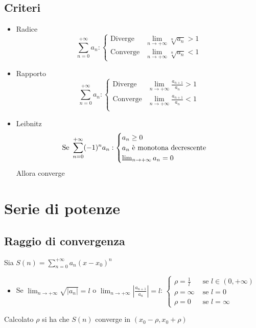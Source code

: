 \documentclass[11pt]{article}
\theoremstyle{definition}
\theoremstyle{remark}
\begin{document}
\subsection*{Criteri}
\begin{itemize}
    \item Radice
        \begin{equation*}
            \sum_{n=0}^{+\infty}a_n: \begin{cases}
                \text{Diverge} & \lim_{n\to+\infty}\sqrt[n]{a_n} > 1\\
                \text{Converge} & \lim_{n\to+\infty}\sqrt[n]{a_n} < 1
            \end{cases}
        \end{equation*}
    \item Rapporto
        \begin{equation*}
            \sum_{n=0}^{+\infty}a_n: \begin{cases}
                \text{Diverge} & \lim_{n\to+\infty} \frac{a_{n+1}}{a_n} > 1\\
                \text{Converge} & \lim_{n\to+\infty} \frac{a_{n+1}}{a_n} < 1\\            \end{cases}
        \end{equation*}
    \item Leibnitz
        \begin{equation*}
            \text{Se }\sum_{n=0}^{+\infty}(-1)^na_n: \begin{cases}
                a_n\geq 0 \\
                a_n \text{ è monotona decrescente} \\
                \lim_{n\to+\infty}a_n=0
            \end{cases} \\
        \end{equation*}
        Allora converge
\end{itemize}

\section*{Serie di potenze}
\subsection*{Raggio di convergenza}
Sia $S(n)=\sum_{n=0}^{+\infty}a_n(x-x_0)^n$
\begin{itemize}
    \item Se $\lim_{n\to+\infty}\sqrt{|a_n|}=l$ o $\lim_{n\to+\infty}|\frac{a_{n+1}}{a_n}|=l$:
        $\begin{cases}
            \rho = \frac{1}{l} & \text{ se } l\in(0, +\infty) \\
            \rho = \infty & \text{ se } l=0 \\
            \rho = 0 & \text{ se } l=\infty
        \end{cases}$
\end{itemize}
Calcolato $\rho$ si ha che $S(n)$ converge in $(x_0 - \rho, x_0 + \rho)$
\end{document}
